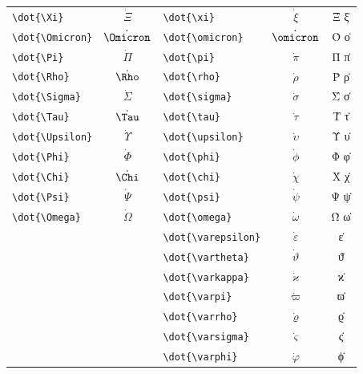 \documentclass[12pt,a4paper]{article}
\begin{document}
\begin{longtable}{|l|c|l|c|c|}
\verb|\dot{\Xi}|         & $\dot{\Xi}$      & \verb|\dot{\xi}|         & $\dot{\xi}$         & Ξ̇ ξ̇ \\
\verb|\dot{\Omicron}|    & $\dot{\Omicron}$ & \verb|\dot{\omicron}|    & $\dot{\omicron}$    & Ο̇ ο̇ \\
\verb|\dot{\Pi}|         & $\dot{\Pi}$      & \verb|\dot{\pi}|         & $\dot{\pi}$         & Π̇ π̇ \\
\verb|\dot{\Rho}|        & $\dot{\Rho}$     & \verb|\dot{\rho}|        & $\dot{\rho}$        & Ρ̇ ρ̇ \\
\verb|\dot{\Sigma}|      & $\dot{\Sigma}$   & \verb|\dot{\sigma}|      & $\dot{\sigma}$      & Σ̇ σ̇ \\
\verb|\dot{\Tau}|        & $\dot{\Tau}$     & \verb|\dot{\tau}|        & $\dot{\tau}$        & Τ̇ τ̇ \\
\verb|\dot{\Upsilon}|    & $\dot{\Upsilon}$ & \verb|\dot{\upsilon}|    & $\dot{\upsilon}$    & Υ̇ υ̇ \\
\verb|\dot{\Phi}|        & $\dot{\Phi}$     & \verb|\dot{\phi}|        & $\dot{\phi}$        & Φ̇ φ̇ \\
\verb|\dot{\Chi}|        & $\dot{\Chi}$     & \verb|\dot{\chi}|        & $\dot{\chi}$        & Χ̇ χ̇ \\
\verb|\dot{\Psi}|        & $\dot{\Psi}$     & \verb|\dot{\psi}|        & $\dot{\psi}$        & Ψ̇ ψ̇ \\
\verb|\dot{\Omega}|      & $\dot{\Omega}$   & \verb|\dot{\omega}|      & $\dot{\omega}$      & Ω̇ ω̇ \\
                         &                  & \verb|\dot{\varepsilon}| & $\dot{\varepsilon}$ & ε̇ \\
                         &                  & \verb|\dot{\vartheta}|   & $\dot{\vartheta}$   & ϑ̇ \\
                         &                  & \verb|\dot{\varkappa}|   & $\dot{\varkappa}$   & ϰ̇ \\
                         &                  & \verb|\dot{\varpi}|      & $\dot{\varpi}$      & ϖ̇ \\
                         &                  & \verb|\dot{\varrho}|     & $\dot{\varrho}$     & ϱ̇ \\
                         &                  & \verb|\dot{\varsigma}|   & $\dot{\varsigma}$   & ς̇ \\
                         &                  & \verb|\dot{\varphi}|     & $\dot{\varphi}$     & ϕ̇ \\
\hline
\end{longtable}
\end{document}
